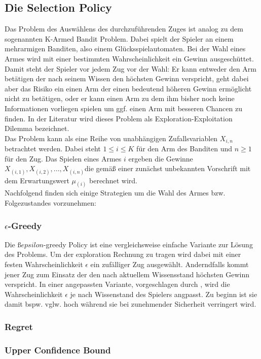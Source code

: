 \subsection{Die Selection Policy}
Das Problem des Auswählens des durchzuführenden Zuges ist analog zu dem sogenannten K-Armed Bandit Problem. Dabei spielt der Spieler an einem mehrarmigen Banditen, also einem Glücksspielautomaten. Bei der Wahl eines Armes wird mit einer bestimmten Wahrscheinlichkeit ein Gewinn ausgeschüttet. Damit steht der Spieler vor jedem Zug vor der Wahl: Er kann entweder den Arm betätigen der nach seinem Wissen den höchsten Gewinn verspricht, geht dabei aber das Risiko ein einen Arm der einen bedeutend höheren Gewinn ermöglicht nicht zu betätigen, oder er kann einen Arm zu dem ihm bisher noch keine Informationen vorliegen spielen um ggf. einen Arm mit besseren Chancen zu finden. In der Literatur wird dieses Problem als Exploration-Exploitation Dilemma bezeichnet.\\
Das Problem kann als eine Reihe von unabhängigen Zufallsvariablen \(X_{ i, n }\) betrachtet werden. Dabei steht \( 1 \leq i \leq K\) für den Arm des Banditen und \(n \geq 1 \) für den Zug. Das Spielen eines Armes \(i\) ergeben die Gewinne \(X_( i, 1), X_( i, 2), ..., X_(i, n)\)die gemäß einer zunächst unbekannten Vorschrift mit dem Erwartungswert \(\mu_(i)\) berechnet wird. \cite{browne2012survey}\\
Nachfolgend finden sich einige Strategien um die Wahl des Armes bzw. Folgezustandes vorzunehmen:
\subsubsection{$\epsilon$-Greedy}
Die $ßepsilon$-greedy Policy ist eine vergleichsweise einfache Variante zur Lösung des Problems. Um der exploration Rechnung zu tragen wird dabei mit einer festen Wahrscheinlichkeit $\epsilon$ ein zufälliger Zug ausgewählt. Anderndfalls kommt jener Zug zum Einsatz der den nach aktuellem Wissensstand höchsten Gewinn verspricht. In einer angepassten Variante, vorgeschlagen durch , wird die Wahrscheinlichkeit $\epsilon$ je nach Wissenstand des Spielers angpasst. Zu beginn ist sie damit bspw. vglw. hoch während sie bei zunehmender Sicherheit verringert wird.
\subsubsection{Regret}
\subsubsection{Upper Confidence Bound}